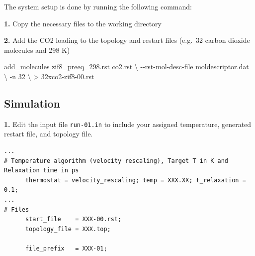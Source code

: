 \documentclass[
  letterpaper,
]{article}
\newenvironment{Shaded}{\begin{snugshade}}{\end{snugshade}}
\newcommand{\AttributeTok}[1]{\textcolor[rgb]{0.40,0.45,0.13}{#1}}
\newcommand{\DataTypeTok}[1]{\textcolor[rgb]{0.68,0.00,0.00}{#1}}
\newcommand{\ExtensionTok}[1]{\textcolor[rgb]{0.00,0.23,0.31}{#1}}
\newcommand{\FunctionTok}[1]{\textcolor[rgb]{0.28,0.35,0.67}{#1}}
\newcommand{\NormalTok}[1]{\textcolor[rgb]{0.00,0.23,0.31}{#1}}
\newcommand{\OperatorTok}[1]{\textcolor[rgb]{0.37,0.37,0.37}{#1}}
\newcommand{\PreprocessorTok}[1]{\textcolor[rgb]{0.68,0.00,0.00}{#1}}
\newcommand{\VariableTok}[1]{\textcolor[rgb]{0.07,0.07,0.07}{#1}}
\begin{document}

The system setup is done by running the following command:

\textbf{1.} Copy the necessary files to the working directory

\begin{Shaded}
\end{Shaded}

\textbf{2.} Add the CO2 loading to the topology and restart files
(e.g.~32 carbon dioxide molecules and 298 K)

\begin{Shaded}
\begin{Highlighting}[]
\ExtensionTok{add\_molecules}\NormalTok{ zif8\_preeq\_298.rst co2.rst   }\DataTypeTok{\textbackslash{}}
  \AttributeTok{{-}{-}rst{-}mol{-}desc{-}file}\NormalTok{ moldescriptor.dat   }\DataTypeTok{\textbackslash{}}
  \AttributeTok{{-}n}\NormalTok{ 32                                   }\DataTypeTok{\textbackslash{}}
  \OperatorTok{\textgreater{}}\NormalTok{ 32xco2{-}zif8{-}00.rst}
\end{Highlighting}
\end{Shaded}

\hypertarget{simulation}{%
\subsection*{Simulation}\label{simulation}}


\textbf{1.} Edit the input file \texttt{run-01.in} to include your
assigned temperature, generated restart file, and topology file.

\begin{verbatim}
...
# Temperature algorithm (velocity rescaling), Target T in K and Relaxation time in ps
      thermostat = velocity_rescaling; temp = XXX.XX; t_relaxation = 0.1;
...
# Files
      start_file    = XXX-00.rst;
      topology_file = XXX.top;

      file_prefix   = XXX-01;
\end{verbatim}
\end{document}
